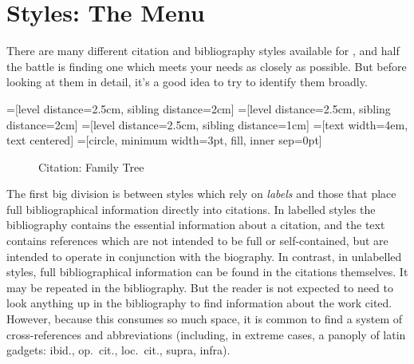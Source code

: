 \chapter{Styles: The Menu}\label{ch:bibstyles}

There are many different citation and bibliography styles available
for \biblatex, and half the battle is finding one which meets your
needs as closely as possible. But before looking at them in detail,
it's a good idea to try to identify them broadly.

=[level distance=2.5cm, sibling distance=2cm]
=[level distance=2.5cm, sibling distance=2cm]
=[level distance=2.5cm, sibling distance=1cm]
=[text width=4em, text centered]
=[circle, minimum width=3pt, fill, inner sep=0pt]

\begin{figure}
\sffamily
{}
\caption{Citation: Family Tree}
\end{figure}

The first big division is between styles which rely on \emph{labels}
and those that place full bibliographical information directly into
citations. In labelled styles the bibliography contains the essential
information about a citation, and the text contains references which
are not intended to be full or self-contained, but are intended to
operate in conjunction with the biography. In contrast, in unlabelled
styles, full bibliographical information can be found in the citations
themselves. It may be repeated in the bibliography. But the reader is
not expected to need to look anything up in the bibliography to find
information about the work cited. However, because this consumes so
much space, it is common to find a system of cross-references and
abbreviations (including, in extreme cases, a panoply of latin
gadgets: ibid., op.\ cit., loc.\ cit., supra, infra).

